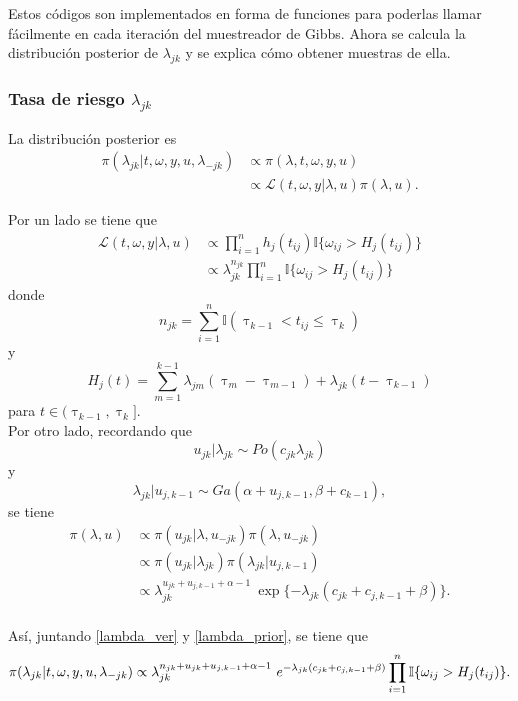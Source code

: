 \documentclass[11pt,a4paper]{article}
\begin{document}
Estos códigos son implementados en forma de funciones para poderlas llamar fácilmente en cada iteración del muestreador de Gibbs. Ahora se calcula la distribución posterior de $\lambda_{jk}$ y se explica cómo obtener muestras de ella.

\subsubsection*{Tasa de riesgo $\lambda_{jk}$}
\label{posterior_lambda}

La distribución posterior es
\begin{align*}
\pi(\lambda_{jk} | t, \omega, y, u, \lambda_{-jk}) &\propto \pi(\lambda, t, \omega, y, u)\\
&\propto \mathcal{L}(t, \omega, y | \lambda, u) \pi(\lambda, u).
\end{align*}

Por un lado se tiene que
\begin{align} \label{lambda_ver}
\mathcal{L}(t, \omega, y | \lambda, u) &\propto \prod_{i = 1}^n h_j(t_{ij}) \mathbb{I}\lbrace \omega_{ij} > H_j(t_{ij}) \rbrace \nonumber\\
&\propto \lambda_{jk}^{n_{jk}} \prod_{i = 1}^n \mathbb{I}\lbrace \omega_{ij} > H_j(t_{ij}) \rbrace
\end{align}
donde $$n_{jk} = \sum_{i=1}^n \mathbb{I}(\uptau_{k-1} < t_{ij} \leq \uptau_k)$$ y $$H_j(t) = \sum_{m = 1}^{k-1} \lambda_{jm}(\uptau_m - \uptau_{m-1}) + \lambda_{jk}(t - \uptau_{k-1})$$ para $t\in (\uptau_{k-1}, \uptau_k].$\\

Por otro lado, recordando que $$u_{jk}|\lambda_{jk} \sim Po(c_{jk}\lambda_{jk})$$ y $$\lambda_{jk}|u_{j,k-1} \sim Ga(\alpha + u_{j, k-1}, \beta + c_{k-1}),$$ se tiene
\begin{align} \label{lambda_prior}
\pi(\lambda, u) &\propto \pi(u_{jk} | \lambda, u_{-jk})\pi(\lambda, u_{-jk}) \nonumber \\
&\propto \pi(u_{jk} | \lambda_{jk})\pi(\lambda_{jk}| u_{j, k-1}) \nonumber \\
&\propto \lambda_{jk}^{u_{jk} + u_{j, k-1} + \alpha - 1} \ \exp\lbrace-\lambda_{jk}(c_{jk} + c_{j, k-1} + \beta)\rbrace. \nonumber \\
\end{align}

Así, juntando \eqref{lambda_ver} y \eqref{lambda_prior}, se tiene que
\begin{equation*}
\pi(\lambda_{jk} | t, \omega, y, u, \lambda_{-jk}) \propto \lambda_{jk}^{n_{jk} + u_{jk} + u_{j, k-1} + \alpha - 1} \ e^{-\lambda_{jk}(c_{jk} + c_{j, k-1} + \beta)} \prod_{i=1}^n \mathbb{I}\lbrace \omega_{ij} > H_j(t_{ij}) \rbrace.\\
\end{equation*}
\end{document}
